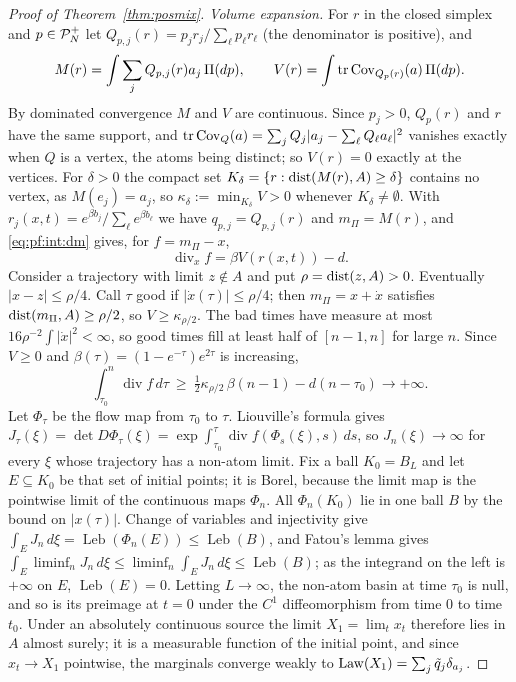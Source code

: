\documentclass{article}
\theoremstyle{plain}
\theoremstyle{remark}
\begin{document}
\begin{proof}[Proof of Theorem~\ref{thm:posmix}]
\emph{Volume expansion.} For $r$ in the closed simplex and $p\in\mathcal{P}_N^{+}$ let
$Q_{p,j}(r)=p_jr_j/\sum_\ell p_\ell r_\ell$ (the denominator is positive), and
\[
M(r)=\int\sum_jQ_{p,j}(r)a_j\,\Pi(dp),\qquad V(r)=\int\operatorname{tr}\operatorname{Cov}_{Q_p(r)}(a)\,\Pi(dp).
\]
By dominated convergence $M$ and $V$ are continuous. Since $p_j>0$, $Q_p(r)$ and $r$ have the
same support, and $\operatorname{tr}\operatorname{Cov}_Q(a)=\sum_jQ_j|a_j-\sum_\ell Q_\ell a_\ell|^2$ vanishes exactly when
$Q$ is a vertex, the atoms being distinct; so $V(r)=0$ exactly at the vertices. For $\delta>0$
the compact set $K_\delta=\{r:\operatorname{dist}(M(r),A)\ge\delta\}$ contains no vertex, as $M(e_j)=a_j$,
so $\kappa_\delta:=\min_{K_\delta}V>0$ whenever $K_\delta\neq\emptyset$. With
$r_j(x,t)=e^{\beta b_j}/\sum_\ell e^{\beta b_\ell}$ we have $q_{p,j}=Q_{p,j}(r)$ and
$m_\Pi=M(r)$, and \eqref{eq:pf:int:dm} gives, for $f=m_\Pi-x$,
\[
\operatorname{div}_xf=\beta V(r(x,t))-d .
\]
Consider a trajectory with limit $z\notin A$ and put $\rho=\operatorname{dist}(z,A)>0$. Eventually
$|x-z|\le\rho/4$. Call $\tau$ good if $|\dot x(\tau)|\le\rho/4$; then $m_\Pi=x+\dot x$ satisfies
$\operatorname{dist}(m_\Pi,A)\ge\rho/2$, so $V\ge\kappa_{\rho/2}$. The bad times have measure at most
$16\rho^{-2}\int|\dot x|^2<\infty$, so good times fill at least half of $[n-1,n]$ for large $n$.
Since $V\ge0$ and $\beta(\tau)=(1-e^{-\tau})e^{2\tau}$ is increasing,
\[
\int_{\tau_0}^n\operatorname{div}f\,d\tau\ \ge\ \tfrac12\kappa_{\rho/2}\,\beta(n-1)-d(n-\tau_0)
\longrightarrow+\infty .
\]
Let $\Phi_\tau$ be the flow map from $\tau_0$ to $\tau$. Liouville's formula gives
$J_\tau(\xi)=\det D\Phi_\tau(\xi)=\exp\int_{\tau_0}^\tau\operatorname{div}f(\Phi_s(\xi),s)\,ds$,
so $J_n(\xi)\to\infty$ for every $\xi$ whose trajectory has a non-atom limit. Fix a ball
$K_0=B_L$ and let $E\subseteq K_0$ be that set of initial points; it is Borel, because the limit
map is the pointwise limit of the continuous maps $\Phi_n$. All $\Phi_n(K_0)$ lie in one ball
$B$ by the bound on $|x(\tau)|$. Change of variables and injectivity give
$\int_EJ_n\,d\xi=\operatorname{Leb}(\Phi_n(E))\le\operatorname{Leb}(B)$, and Fatou's lemma gives
$\int_E\liminf_nJ_n\,d\xi\le\liminf_n\int_EJ_n\,d\xi\le\operatorname{Leb}(B)$; as the integrand
on the left is $+\infty$ on $E$, $\operatorname{Leb}(E)=0$. Letting
$L\to\infty$, the non-atom basin at time $\tau_0$ is null, and so is its preimage at $t=0$
under the $C^1$ diffeomorphism from time $0$ to time $t_0$. Under an absolutely continuous
source the limit $X_1=\lim_tx_t$ therefore lies in $A$ almost surely; it is a measurable
function of the initial point, and since $x_t\to X_1$ pointwise, the marginals converge
weakly to $\mathrm{Law}(X_1)=\sum_j\tilde q_j\delta_{a_j}$.
\end{proof}
\end{document}
